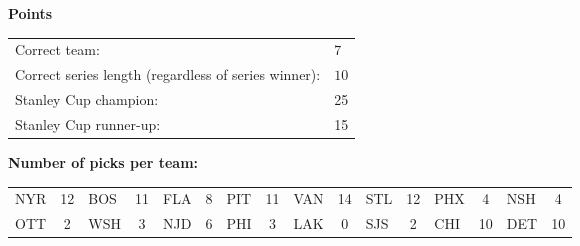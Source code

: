 \documentclass[10pt]{article}
\begin{document}
{\bf Points}\\
\begin{minipage}{12cm}
    \begin{tabular}{l l}
        Correct team:	& $7$\\
        Correct series length (regardless of series winner):	& $10$\\
        Stanley Cup champion:	& 25\\
        Stanley Cup runner-up:	& 15\\
    \end{tabular}

    \vspace{1cm}
    {\bf Number of picks per team:}\\
    \begin{tabular}{lc | lc | lc | lc | lc | lc | lc | lc }
        NYR & 12 & BOS & 11 & FLA & 8 & PIT & 11 & VAN & 14 & STL & 12 & PHX & 4 & NSH & 4 \\
        OTT & 2 & WSH & 3 & NJD & 6 & PHI & 3 & LAK & 0 & SJS & 2 & CHI & 10 & DET & 10 \\
    \end{tabular}
\end{minipage}
\end{document}
